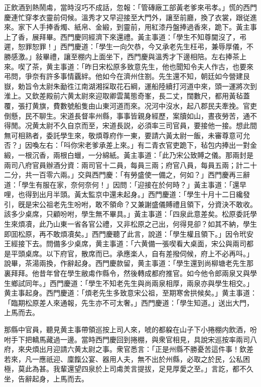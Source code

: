 正飲酒到熱鬧䖏，當時沒巧不成話，忽報：「管磚廠工部黃老爹來弔孝。」慌的西門慶連忙穿孝衣靈前伺候。溫秀才又早迎接至大門外，讓至前廳，換了衣裳，跟従進來。家下人手捧香燭、紙帛、金緞，到靈前，用紅漆丹盤捧過香來，跪下。黃主事上了香，展拜畢。西門慶同經濟下來還禮。黃主事道：「學生不知尊閫沒了，弔遲，恕罪恕罪！」西門慶道：「學生一向欠恭，今又承老先生枉弔，兼辱厚儀，不勝感激。」敍畢禮，讓至棚内上面坐下，西門慶與溫秀才下邊相陪。左右捧茶上來。喫了茶，黄主事道：「昨日宋松原多致意先生，他也聞知令夫人作古，也要來弔問，爭奈有許多事情覊絆。他如今在濟州住劄。先生還不知，朝廷如今營建艮嶽，勅旨令太尉朱勔徃江南湖湘採取花石綱，運船陸續打河道中來，頭一運將次到淮上。又欽差殿前六黄太尉來迎取卿雲萬態奇峯，長二丈，闊數尺，都用黃毡蓋覆，張打黄旗，費數號船隻由山東河道而來。况河中沒水，起八郡民夫牽挽。官吏倒懸，民不聊生。宋道長督率州縣，事事皆親身經歷，案牘如山，晝夜勞苦，通不得閒。况黄太尉不久自京而至，宋道長説，必須率三司官員，要接他一接。想此間無可相熟者，委託學生來，敬煩尊府作一東，要請六黃太尉一飯，未審尊意可允否？」因喚左右：「呌你宋老爹承差上來。」有二青衣官吏跪下，毡包内捧出一對金緞，一根沉香，兩根白蠟，一分綿紙。黃主事道：「此乃宋公致賻之儀。那兩封是兩司八府官員辦酒分資：兩司官十二員，每員三兩；府官八員，每員五兩；計二十二分，共一百零六兩。」交與西門慶：「有勞盛使一備之，何如？」西門慶再三辭道：「學生有服在家，奈何奈何！」因問：「迎接在於何時？」黃主事道：「還早哩，也得到出月半頭。黃太監京中還未起身。」西門慶道：「學生十月十二日纔發引，旣是宋公祖老先生吩咐，敢不領命？又兼謝盛儀賻禮且領下，分資決不敢收。該多少桌席，只顧吩咐，學生無不畢具。」黃主事道：「四泉此意差矣。松原委託學生來煩凟，此乃山東一省各官公禮，又非松原之己出，何得見卻？如其不納，學生即囬松原，再不敢煩凟矣。」西門慶聽了此言，說道：「學生權且領下。」因令玳安王經接下去。問備多少桌席，黄主事道：「六黄備一張喫看大桌面，宋公與兩司都是平頭桌席。以下府官，散席而已。承應楽人，自有差撥伺候，府上不必再呌。」說畢，茶湯兩換，作辭起身。西門慶款留，黄主事道：「學生還到尚柳塘老先生那裏拜拜。他昔年曾在學生敝䖏作縣令，然後轉成都府推官。如今他令郎兩泉又與學生鄉試同年。」西門慶道：「學生不知老先生與尚兩泉相厚，兩泉亦與學生相交。」黄主事起身。西門慶道：「煩老先生多致意宋公祖，至期寒舍拱候矣。」黄主事道：「臨期松原差人來通報，先生亦不可太奢。」西門慶道：「學生知道。」送出大門，上馬而去。

那縣中官員，聽見黄主事帶領巡按上司人來，唬的都躱在山子下小捲棚内飲酒，吩咐手下把轎馬藏過一邊。當時西門慶回到捲棚，與衆官相見，具說宋巡按率兩司八府，來央煩出月迎請六黄太尉之事。衆官悉言：「正是州縣不勝憂苦這件事！欽差若來，凡一應祇迎、廩餼公宴、器用人夫，無不出於州縣，必取之於民，公私困極，莫此為甚。我輩還望四泉於上司䖏羙言提拔，足見厚愛之至。」言訖，都不久坐，告辭起身，上馬而去。

